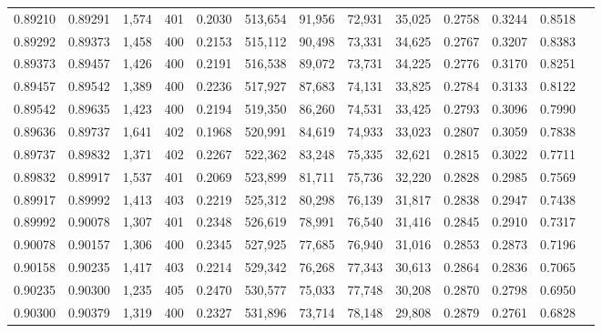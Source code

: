 \begin{tabular}{rrrrrrrrrrrrr}
0.89210 & 0.89291 & 1,574 & 401 &                                     0.2030 & 513,654 &  91,956 &  72,931 &  35,025 & 0.2758 & 0.3244 & 0.8518 \\
0.89292 & 0.89373 & 1,458 & 400 &                                     0.2153 & 515,112 &  90,498 &  73,331 &  34,625 & 0.2767 & 0.3207 & 0.8383 \\
0.89373 & 0.89457 & 1,426 & 400 &                                     0.2191 & 516,538 &  89,072 &  73,731 &  34,225 & 0.2776 & 0.3170 & 0.8251 \\
0.89457 & 0.89542 & 1,389 & 400 &                                     0.2236 & 517,927 &  87,683 &  74,131 &  33,825 & 0.2784 & 0.3133 & 0.8122 \\
0.89542 & 0.89635 & 1,423 & 400 &                                     0.2194 & 519,350 &  86,260 &  74,531 &  33,425 & 0.2793 & 0.3096 & 0.7990 \\
0.89636 & 0.89737 & 1,641 & 402 &                                     0.1968 & 520,991 &  84,619 &  74,933 &  33,023 & 0.2807 & 0.3059 & 0.7838 \\
0.89737 & 0.89832 & 1,371 & 402 &                                     0.2267 & 522,362 &  83,248 &  75,335 &  32,621 & 0.2815 & 0.3022 & 0.7711 \\
0.89832 & 0.89917 & 1,537 & 401 &                                     0.2069 & 523,899 &  81,711 &  75,736 &  32,220 & 0.2828 & 0.2985 & 0.7569 \\
0.89917 & 0.89992 & 1,413 & 403 &                                     0.2219 & 525,312 &  80,298 &  76,139 &  31,817 & 0.2838 & 0.2947 & 0.7438 \\
0.89992 & 0.90078 & 1,307 & 401 &                                     0.2348 & 526,619 &  78,991 &  76,540 &  31,416 & 0.2845 & 0.2910 & 0.7317 \\
0.90078 & 0.90157 & 1,306 & 400 &                                     0.2345 & 527,925 &  77,685 &  76,940 &  31,016 & 0.2853 & 0.2873 & 0.7196 \\
0.90158 & 0.90235 & 1,417 & 403 &                                     0.2214 & 529,342 &  76,268 &  77,343 &  30,613 & 0.2864 & 0.2836 & 0.7065 \\
0.90235 & 0.90300 & 1,235 & 405 &                                     0.2470 & 530,577 &  75,033 &  77,748 &  30,208 & 0.2870 & 0.2798 & 0.6950 \\
0.90300 & 0.90379 & 1,319 & 400 &                                     0.2327 & 531,896 &  73,714 &  78,148 &  29,808 & 0.2879 & 0.2761 & 0.6828 \\

\end{tabular}

